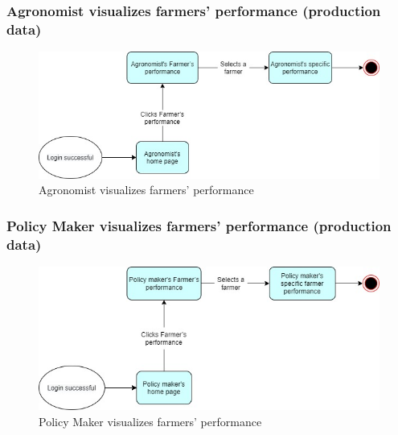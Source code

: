 \documentclass{article}
\begin{document}
        
        \subsubsection{Agronomist visualizes farmers' performance (production data)}
            \begin{figure} [h]
                \centering
                \includegraphics[width=1\textwidth]{images/UserInterfaces/MapsFunctionalities/19. AgronomistVisualizesFarmersPerformance.jpg}
                \caption{\label{fig:AgronomistVisualizeProdData}Agronomist visualizes farmers' performance}
            \end{figure}
    
        \newpage
        
        
        
        \subsubsection{Policy Maker visualizes farmers' performance (production data)}
            \begin{figure} [h]
                \centering
                \includegraphics[width=1\textwidth]{images/UserInterfaces/MapsFunctionalities/21. PolicyMakerVisualizeFarmersPerformance.jpg}
                \caption{\label{fig:PolicyMakerVisualizeProdData}Policy Maker visualizes farmers' performance}
            \end{figure}
        
\end{document}
